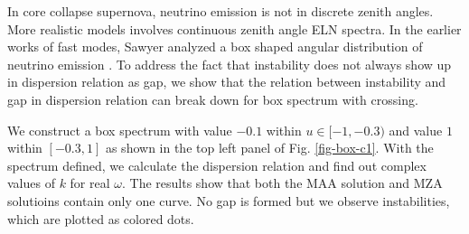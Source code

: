 \documentclass[%
preprint,
 amsmath,amssymb,
 aps,
 prd
]{revtex4-1}
\begin{document}
In core collapse supernova, neutrino emission is not in discrete zenith angles. More realistic models involves continuous zenith angle ELN spectra. In the earlier works of fast modes, Sawyer analyzed a box shaped angular distribution of neutrino emission \cite{Sawyer2016}. To address the fact that instability does not always show up in dispersion relation as gap, we show that the relation between instability and gap in dispersion relation can break down for box spectrum with crossing.



We construct a box spectrum with value $-0.1$ within $u\in [-1,-0.3)$ and value $1$ within $[-0.3,1]$ as shown in the top left panel of Fig. \ref{fig-box-c1}. With the spectrum defined, we calculate the dispersion relation and find out complex values of $k$ for real $\omega$. The results show that both the MAA solution and MZA solutioins contain only one curve. No gap is formed but we observe instabilities, which are plotted as colored dots.
\end{document}
